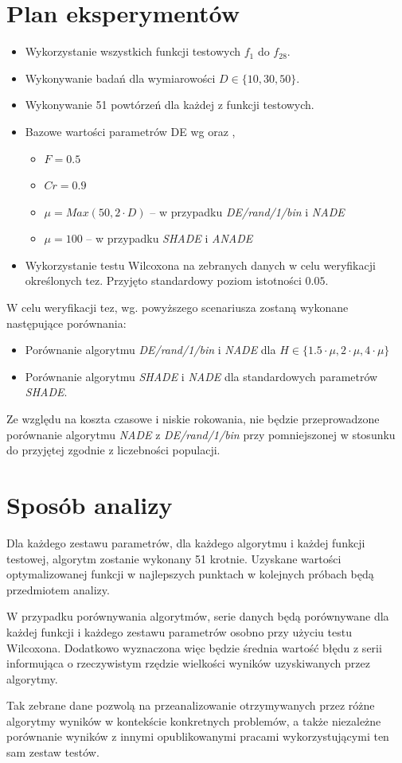 \documentclass[12pt,a4paper]{report}
\begin{document}
{{{{{{{\section{Plan eksperymentów}
\par{
\begin{itemize}
\item Wykorzystanie wszystkich funkcji testowych $f_1$ do $f_{28}$.
\item Wykonywanie badań dla wymiarowości $D \in \{10, 30, 50\}$.
\item Wykonywanie 51 powtórzeń dla każdej z funkcji testowych.
\item Bazowe wartości parametrów DE wg \cite{CEC2013DEbasic} oraz \cite{SHADE},
\begin{itemize}
\item $F = 0.5$
\item $Cr = 0.9$
\item $\mu = Max(50, 2 \cdot D)$ -- w przypadku \emph{DE/rand/1/bin} i \emph{NADE}
\item $\mu = 100$ -- w przypadku \emph{SHADE} i \emph{ANADE}
\end{itemize}
\item Wykorzystanie testu Wilcoxona na zebranych danych w celu weryfikacji określonych tez. Przyjęto standardowy poziom istotności $0.05$.
\end{itemize}
}
\par{
W celu weryfikacji tez, wg. powyższego scenariusza zostaną wykonane następujące porównania:
\begin{itemize}
\item Porównanie algorytmu \emph{DE/rand/1/bin} i \emph{NADE} dla $H \in \{1.5 \cdot \mu, 2 \cdot \mu, 4 \cdot \mu \}$
\item Porównanie algorytmu \emph{SHADE} i \emph{NADE} dla standardowych parametrów \emph{SHADE}.
\end{itemize}
}
\par{
Ze względu na koszta czasowe i niskie rokowania, nie będzie przeprowadzone porównanie algorytmu \emph{NADE} z \emph{DE/rand/1/bin} przy pomniejszonej w stosunku do przyjętej zgodnie z \cite{CEC2013DEbasic} liczebności populacji.
}

\section{Sposób analizy}
\par{
Dla każdego zestawu parametrów, dla każdego algorytmu i każdej funkcji testowej, algorytm zostanie wykonany 51 krotnie. Uzyskane wartości optymalizowanej funkcji w najlepszych punktach w kolejnych próbach będą przedmiotem analizy.
}
\par{
W przypadku porównywania algorytmów, serie danych będą porównywane dla każdej funkcji i każdego zestawu parametrów osobno przy użyciu testu Wilcoxona. Dodatkowo wyznaczona więc będzie średnia wartość błędu z serii informująca o rzeczywistym rzędzie wielkości wyników uzyskiwanych przez algorytmy.
}
\par{
Tak zebrane dane pozwolą na przeanalizowanie otrzymywanych przez różne algorytmy wyników w kontekście konkretnych problemów, a także niezależne porównanie wyników z innymi opublikowanymi pracami wykorzystującymi ten sam zestaw testów.
}
}}}}}}}
\end{document}

